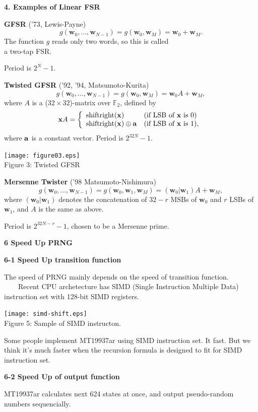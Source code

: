 \documentclass[a4j,12pt,landscape]{jarticle}
\def\F2{{\mathbb F}_2}
\def\bx{{{\mathbf x}}}
\def\bw{{{\mathbf w}}}
\begin{document}
\newpage
\noindent
{\bf 4. Examples of Linear FSR}

{\bf GFSR} ('73, Lewis-Payne)
$$
g(\bw_0,\ldots,\bw_{N-1}) = g(\bw_0, \bw_M) = \bw_0 + \bw_M.
$$
The function $g$ reads only two words, so this is called \\
a two-tap FSR.

Period is $2^N-1$.

\newpage
{\bf Twisted GFSR} ('92, '94, Matsumoto-Kurita)
$$
g(\bw_0,\ldots,\bw_{N-1}) = g(\bw_0, \bw_M) = \bw_0A + \bw_M,
$$
where $A$ is a ($32\times 32$)-matrix over $\F2$, defined by
$$
\bx A = 
\left\{\begin{array}{ll}
  \mbox{shiftright}({\bf x}) & (\mbox{if LSB of $\bx$ is 0}) \\
  \mbox{shiftright}({\bf x})\oplus{\bf a} & 
  (\mbox{if LSB of $\bx$ is 1}),
\end{array}\right.
$$
where ${\bf a}$ is a constant vector.
Period is $2^{32N}-1$. 
\begin{center}
\texttt{[image: figure03.eps]}
\\
Figure 3: Twisted GFSR
\end{center}
\newpage
{\bf Mersenne Twister} ('98 Matsumoto-Nishimura)
$$
g(\bw_0,\ldots,\bw_{N-1}) = g(\bw_0, \bw_1, \bw_M) = (\bw_0|\bw_1)A + \bw_M,
$$
where $(\bw_0|\bw_1)$ denotes
the concatenation of $32-r$ MSBs of $\bw_0$ and $r$ LSBs of $\bw_1$,
and $A$ is the same as above.

Period is $2^{32N-r}-1$, chosen to be a Mersenne prime.

\newpage
\noindent
{\bf 6 Speed Up PRNG}

{\bf 6-1 Speed Up transition function}

The speed of PRNG mainly depends on
the speed of transition function.\\
~~~~Recent CPU archetecture has SIMD (Single Instruction Multiple
Data) instruction set with 128-bit SIMD registers.

\begin{center}
\texttt{[image: simd-shift.eps]}
\\
Figure 5: Sample of SIMD instructon.
\end{center}
Some people implement MT19937ar using SIMD instruction set.
It fast. But we think it's much faster when the recursion formula is
designed to fit for SIMD instruction set.

\newpage
{\bf 6-2 Speed Up of output function}

MT19937ar calculates next 624 states at once,
and output pseudo-random numbers sequencially.
\end{document}
